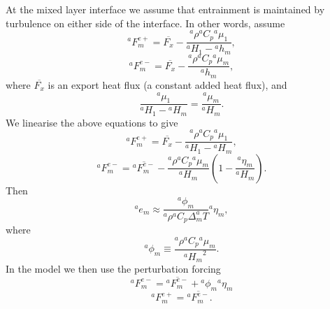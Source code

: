 \documentclass[11pt, a4paper,twoside]{article}
\newcommand{\dt}[2]{\Delta_{#2}^{#1}T}
\newcommand{\etb}[2]{{{}^{#1}\eta_{#2}}}
\newcommand{\rhb}[1]{{{}^{#1}\rho}}
\newcommand{\cp}[1]{{{}^{#1}C_p}}
\newcommand{\HH}[2]{{{}^{#1}H_{#2}}}
\newcommand{\e}[2]{{{}^{#1}e_{#2}}}
\newcommand{\h}[2]{{{}^{#1}h_{#2}}}
\newcommand{\F}[3]{{{}^{#1}F^{#3}_{#2}}}
\newcommand{\mb}[2]{{{}^{#1}\mu_{#2}}}
\newcommand{\lb}[2]{{{}^{#1}\phi_{#2}}}
\numberwithin{equation}{section}
\begin{document}
At the mixed layer interface we assume that entrainment is maintained by turbulence on either side of the interface.
In other words, assume
\begin{equation} \F{a}{m}{e+} = \overline{F_x} - \frac{ \rhb{a} \cp{a} \mb{a}{1}}{\HH{a}{1} - \h{a}{m}},\end{equation}
\begin{equation} \F{a}{m}{e-} = \overline{F_x} - \frac{ \rhb{a} \cp{a} \mb{a}{m}}{\h{a}{m}},\end{equation}
where $\overline{F_x}$ is an export heat flux (a constant added heat flux), and
\begin{equation}\frac{ \mb{a}{1}}{\HH{a}{1}-\HH{a}{m}} = \frac{ \mb{a}{m}}{\HH{a}{m}}.\end{equation}
We linearise the above equations to give
\begin{equation} \F{a}{m}{e+} = \overline{F_x} - \frac{ \rhb{a} \cp{a} \mb{a}{1}}{\HH{a}{1} - \HH{a}{m}},\end{equation}
\begin{equation} \F{a}{m}{e-} = \overline{\F{a}{m}{e-}}  - \frac{\rhb{a} \cp{a} \mb{a}{m}}{\HH{a}{m}} \left(1 - \frac{\etb{a}{m}}{\HH{a}{m}}\right).\end{equation}
Then
\begin{equation}\e{a}{m} \approx \frac{\lb{a}{m}}{\rhb{a} \cp{a}\dt{a}{m}} \etb{a}{m},\end{equation}
where
\begin{equation}\lb{a}{m} \equiv \frac{\rhb{a} \cp{a} \mb{a}{m}}{\HH{a}{m} ^2}.\end{equation}
In the model we then use the perturbation forcing
\begin{equation}\F{a}{m}{e-} = \overline{\F{a}{m}{e-}} +  \lb{a}{m} \etb{a}{m}\end{equation}
\begin{equation}\F{a}{m}{e+} =  \overline{\F{a}{m}{e-}} .\end{equation}
\end{document}
